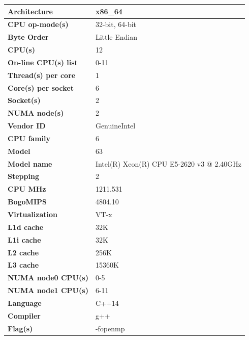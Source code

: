\documentclass[12,a4paper]{article}
\begin{document}
    \begin{table}[H]
        \centering
        \begin{tabular}{ |P{0.4\textwidth}|P{0.6\textwidth}|}
            \hline
            \textbf{Architecture} & x86\_64\\
            \hline
            \textbf{CPU op-mode(s)} & 32-bit, 64-bit\\
            \hline
            \textbf{Byte Order} & Little Endian\\
            \hline
            \textbf{CPU(s)} & 12\\
            \hline
            \textbf{On-line CPU(s) list} & 0-11\\
            \hline
            \textbf{Thread(s) per core} & 1\\
            \hline
            \textbf{Core(s) per socket} & 6\\
            \hline
            \textbf{Socket(s)} & 2\\
            \hline
            \textbf{NUMA node(s)} & 2\\
            \hline
            \textbf{Vendor ID} & GenuineIntel\\
            \hline
            \textbf{CPU family} & 6\\
            \hline
            \textbf{Model} & 63\\
            \hline
            \textbf{Model name} & Intel(R) Xeon(R) CPU E5-2620 v3 @ 2.40GHz\\
            \hline
            \textbf{Stepping} & 2\\
            \hline
            \textbf{CPU MHz} & 1211.531\\
            \hline
            \textbf{BogoMIPS} & 4804.10\\
            \hline
            \textbf{Virtualization} & VT-x\\
            \hline
            \textbf{L1d cache} & 32K\\
            \hline
            \textbf{L1i cache} & 32K\\
            \hline
            \textbf{L2 cache} & 256K\\
            \hline
            \textbf{L3 cache} & 15360K\\
            \hline
            \textbf{NUMA node0 CPU(s)} & 0-5\\
            \hline
            \textbf{NUMA node1 CPU(s)} & 6-11\\
            \hline\hline
            \textbf{Language} & C++14\\
            \hline
            \textbf{Compiler} & g++\\
            \hline
            \textbf{Flag(s)} & -fopenmp\\
            \hline
        \end{tabular}
    \end{table}
    \newpage
\end{document}
